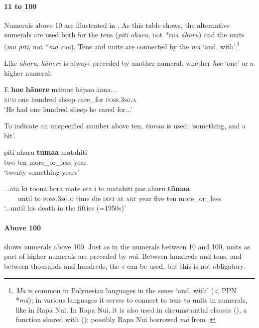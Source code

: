 \paragraph{11 to 100} Numerals above 10 are illustrated in . As this table shows, the alternative numerals are used both for the tens (\textit{piti {\ꞌ}ahuru}, not \textit{*rua {\ꞌ}ahuru}) and the units (\textit{mā piti}, not *\textit{mā rua}). Tens and units are connected by the  \textit{mā} ‘and, with’.\footnote{\label{fn:167}\textit{Mā} is common in Polynesian languages in the sense ‘and, with’ ({\textless} PPN *\textit{mā}); in various languages it serves to connect to tens to units in numerals, like in Rapa Nui. In Rapa Nui, it is also used in circumstantial clauses (), a function shared with  (\citealt[107, 196]{AcadémieTahitienne1986}); possibly Rapa Nui borrowed \textit{m}\textit{ā} from .} 

Like \textit{{\ꞌ}ahuru}, \textit{hānere} is always preceded by another numeral, whether \textit{ho{\ꞌ}e} ‘one’ or a higher numeral:

\ea\label{ex:4.11}
\gll E \textbf{ho{\ꞌ}e} \textbf{hānere} māmoe hāpa{\ꞌ}o {\ꞌ}ā{\ꞌ}ana... \\
\textsc{num} one hundred sheep care\_for \textsc{poss.3sg.a} \\

\glt
‘He had one hundred sheep he cared for...’ \textstyleExampleref{[R490.002]} 
\z

To indicate an unspecified number above ten, \textit{tūma{\ꞌ}a} is used: ‘something, and a bit’.

\ea\label{ex:4.12}
\gll piti {\ꞌ}ahuru \textbf{tūma{\ꞌ}a} matahiti \\
two ten more\_or\_less year \\

\glt 
‘twenty-something years’
\z

\ea\label{ex:4.13}
\gll ...{\ꞌ}ātā ki tō{\ꞌ}ona hora mate era {\ꞌ}i te matahiti pae {\ꞌ}ahuru \textbf{tūma{\ꞌ}a} \\
~~~~until to \textsc{poss.3sg.o} time die \textsc{dist} at \textsc{art} year five ten more\_or\_less \\

\glt 
‘...until his death in the fifties (=1950s)’ \textstyleExampleref{[R539-1.493]}
\z

\paragraph{Above 100}  shows numerals above 100. Just as in the numerals between 10 and 100, units as part of higher numerals are preceded by \textit{mā}. Between hundreds and tens, and between thousands and hundreds, the  \textit{e} can be used, but this is not obligatory. 

